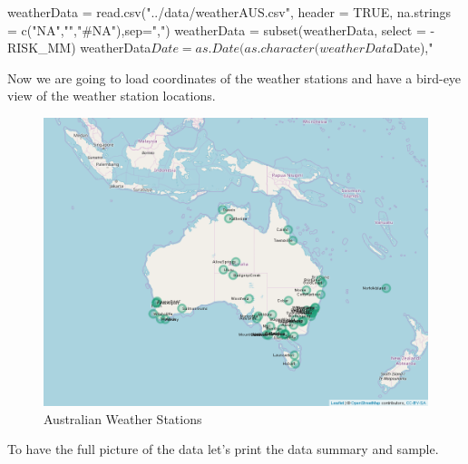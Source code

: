\begin{Schunk}
\begin{Sinput}
weatherData = read.csv("../data/weatherAUS.csv", header = TRUE, na.strings = c("NA","","#NA"),sep=",")
weatherData = subset(weatherData, select = -RISK_MM)
weatherData$Date = as.Date(as.character(weatherData$Date),"%
\end{Sinput}
\end{Schunk}

Now we are going to load coordinates of the weather stations and have a
bird-eye view of the weather station locations.

\begin{Schunk}
\begin{figure}[H]

{\centering \includegraphics[width=1.1\linewidth]{images/weatherStations} 

}

\caption[Australian Weather Stations]{Australian Weather Stations}\label{fig:map}
\end{figure}
\end{Schunk}

To have the full picture of the data let's print the data summary and
sample.


